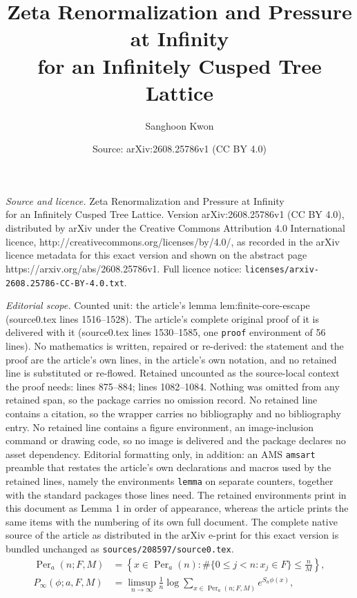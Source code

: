 \documentclass[10pt,a4paper]{amsart}
\title{Zeta Renormalization and Pressure at Infinity\\ for an Infinitely Cusped Tree Lattice}
\author{Sanghoon Kwon}
\date{Source: arXiv:2608.25786v1 (CC BY 4.0)}
\begin{document}
\maketitle

\noindent\emph{Source and licence.} Zeta Renormalization and Pressure at Infinity\\ for an Infinitely Cusped Tree Lattice. Version arXiv:2608.25786v1 (CC BY 4.0), distributed by arXiv under the Creative Commons Attribution 4.0 International licence, http://creativecommons.org/licenses/by/4.0/, as recorded in the arXiv licence metadata for this exact version and shown on the abstract page https://arxiv.org/abs/2608.25786v1. Full licence notice: \texttt{licenses/arxiv-2608.25786-CC-BY-4.0.txt}.\par\smallskip

\noindent\textit{Editorial scope.} Counted unit: the article's lemma lem:finite-core-escape (source0.tex lines 1516--1528). The article's complete original proof of it is delivered with it (source0.tex lines 1530--1585, one \texttt{proof} environment of 56 lines). No mathematics is written, repaired or re-derived: the statement and the proof are the article's own lines, in the article's own notation, and no retained line is substituted or re-flowed.  Retained uncounted as the source-local context the proof needs: lines 875--884; lines 1082--1084.  Nothing was omitted from any retained span, so the package carries no omission record.  No retained line contains a citation, so the wrapper carries no bibliography and no bibliography entry.  No retained line contains a figure environment, an image-inclusion command or drawing code, so no image is delivered and the package declares no asset dependency.  Editorial formatting only, in addition: an AMS \texttt{amsart} preamble that restates the article's own declarations and macros used by the retained lines, namely the environments \texttt{lemma} on separate counters, together with the standard packages those lines need.  The retained environments print in this document as Lemma 1 in order of appearance, whereas the article prints the same items with the numbering of its own full document.  The complete native source of the article as distributed in the arXiv e-print for this exact version is bundled unchanged as \texttt{sources/208597/source0.tex}.
\begin{align}
 \operatorname{Per}_a(n;F,M)
 &=\left\{x\in\operatorname{Per}_a(n):
 \#\{0\le j<n:x_j\in F\}\le\frac nM\right\},
 \label{eq:escaping-periodic-set}\\
 P_\infty(\phi;a,F,M)
 &=\limsup_{n\to\infty}\frac1n
 \log\sum_{x\in\operatorname{Per}_a(n;F,M)}e^{S_n\phi(x)},
 \label{eq:escaping-periodic-pressure}
\end{align}
\end{document}
